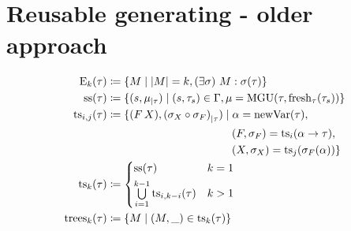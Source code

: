 \documentclass[a4paper,oneside]{memoir}
\begin{document}
~\\

~\\

\section{Reusable generating - older approach}


\begin{definition}
\begin{align*}
\e{k}{\tau} &\defi \{ M \mid \abs{M} = k, \E{\s}{ M : \s(\tau) } \}   \\
\Ss{\tau}   &\defi \{ (s,\restrict{\mu}{\tau}) \mid (s,\tau_s) \in \Gamma, \mu = \MGU{\tau}{\fresh{\tau}{\tau_s}}  \} \\
\TSij{i}{j}{\tau} &\defi \{ \FX,\restrict{(\sX \circ \sF)}{\tau}) \mid \alpha = \newVar{\tau}, \\
  & ~~~~~~~~~~~~~~~~~~~~~~~~~~~~~~~~~~ (F,\sF) = \TS{i}{\alpha \ar \tau}, \\
  & ~~~~~~~~~~~~~~~~~~~~~~~~~~~~~~~~~~ (X,\sX) = \TS{j}{\sF(\alpha)} \} \\
\TS{k}{\tau} &\defi
\begin{cases*}
  \Ss{\tau} & $k = 1$  \\
  \bigcup\limits_{i=1}^{k-1}  \TSij{i}{k-i}{\tau}  & $k > 1$
\end{cases*}\\
\trees{k}{\tau} &\defi \{ M \mid (M,\_) \in \TS{k}{\tau} \}
\end{align*}
\end{definition}
\end{document}
